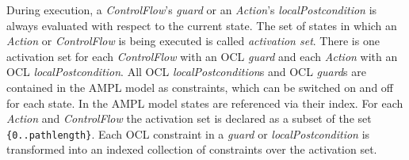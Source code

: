 \documentclass[runningheads,a4paper]{llncs}%
\newcommand{\UMLType}[1]{\textsf{\textit{#1}}} %
\newcommand{\UMLReference}[1]{\textsf{\textit{#1}}} %
\newcommand{\AMPLCode}[1]{\texttt{#1}}
\begin{document}
During execution, a \UMLType{ControlFlow}'s \UMLReference{guard} or an
\UMLType{Action}'s \UMLReference{localPostcondition} is always evaluated with
respect to the current state. The set of states in which an \UMLType{Action} or
\UMLType{ControlFlow} is being executed is called \emph{activation set}. There
is one activation set for each \UMLType{ControlFlow} with an OCL
\UMLReference{guard} and each \UMLType{Action} with an OCL
\UMLReference{localPostcondition}. All OCL \UMLReference{localPostcondition}s
and OCL \UMLReference{guard}s are contained in the AMPL model as constraints,
which can be switched on and off for each state. In the AMPL model states are
referenced via their index. For each \UMLType{Action} and \UMLType{ControlFlow}
the activation set is declared as a subset of the set
\AMPLCode{\{0..pathlength\}}. Each OCL constraint in a \UMLReference{guard} or
\UMLReference{localPostcondition} is transformed into an indexed collection of
constraints over the activation set.
\end{document}
